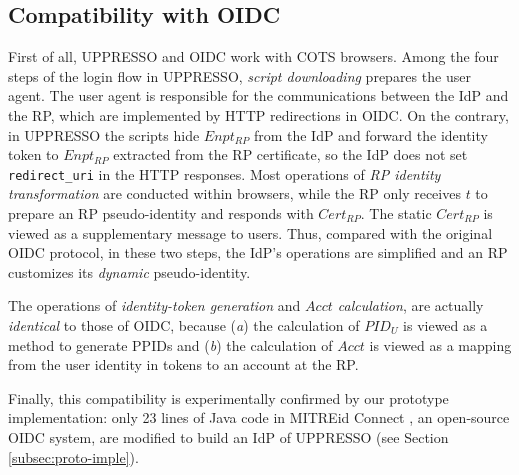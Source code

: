 \subsection{Compatibility with OIDC}
\label{subsec:compatible}
First of all, UPPRESSO and OIDC work with COTS browsers.
Among the four steps of the login flow in UPPRESSO,
    \emph{script downloading} prepares the user agent.
The user agent is responsible for the communications between the IdP and the RP,
    which are implemented by HTTP redirections in OIDC.
On the contrary, in UPPRESSO the scripts hide $Enpt_{RP}$ from the IdP
    and forward the identity token to $Enpt_{RP}$ extracted from the RP certificate,
so the IdP does not set \verb+redirect_uri+ in the HTTP responses. %
Most operations of \emph{RP identity transformation} are conducted within browsers,
 while the RP only receives $t$ to prepare an RP pseudo-identity
  and responds with  $Cert_{RP}$.
The static $Cert_{RP}$ is viewed as a supplementary message to users.
Thus, compared with the original OIDC protocol, in these two steps, the IdP's operations are simplified
    and an RP customizes its \emph{dynamic} pseudo-identity.

The operations of \emph{identity-token generation} and \emph{$Acct$ calculation},
    are actually \emph{identical} to those of OIDC,
    because (\emph{a}) the calculation of $PID_U$ is viewed as a method to generate PPIDs
        and (\emph{b}) the calculation of $Acct$ is viewed as a mapping from the user identity in tokens
                    to an account at the RP.

Finally,
    this compatibility is experimentally confirmed by our prototype implementation:
     only 23 lines of Java code in MITREid Connect \cite{MITREid}, an open-source OIDC system,
 are modified
    to build an IdP of UPPRESSO (see Section \ref{subsec:proto-imple}).

